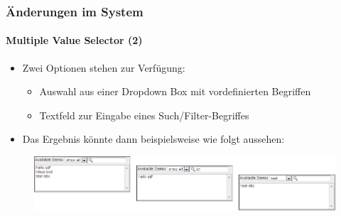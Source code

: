\begin{frame}[fragile]
	\frametitle{Änderungen im System}
	\framesubtitle{Multiple Value Selector (2)}

	\begin{itemize}
		\item Zwei Optionen stehen zur Verfügung:

			\begin{itemize}
				\item Auswahl aus einer Dropdown Box mit vordefinierten Begriffen
				\item Textfeld zur Eingabe eines Such/Filter-Begriffes
			\end{itemize}

		\item Das Ergebnis könnte dann beispielsweise wie folgt aussehen:
	\end{itemize}

	\begin{figure}
		\includegraphics[width=1\linewidth]{Images/InDepthChanges/MultipleValueSelector.png}
	\end{figure}

\end{frame}


